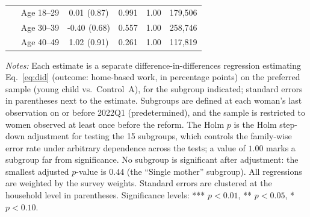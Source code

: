 \begin{table}[H]
{\begin{tabular}{lcccc}
$\quad$ Age 18--29 & 0.01$^{}$ (0.87) & 0.991 & 1.00 & 179,506 \\
$\quad$ Age 30--39 & -0.40$^{}$ (0.68) & 0.557 & 1.00 & 258,746 \\
$\quad$ Age 40--49 & 1.02$^{}$ (0.91) & 0.261 & 1.00 & 117,819 \\
\bottomrule\end{tabular}}
\par\vspace{3pt}\footnotesize\raggedright \textit{Notes:} Each estimate is a separate difference-in-differences regression estimating Eq.~\eqref{eq:did} (outcome: home-based work, in percentage points) on the preferred sample (young child vs.\ Control~A), for the subgroup indicated; standard errors in parentheses next to the estimate. Subgroups are defined at each woman's last observation on or before 2022Q1 (predetermined), and the sample is restricted to women observed at least once before the reform. The Holm $p$ is the Holm step-down adjustment for testing the 15 subgroups, which controls the family-wise error rate under arbitrary dependence across the tests; a value of $1.00$ marks a subgroup far from significance. No subgroup is significant after adjustment: the smallest adjusted $p$-value is $0.44$ (the ``Single mother'' subgroup). All regressions are weighted by the survey weights. Standard errors are clustered at the household level in parentheses. Significance levels: *** $p<0.01$, ** $p<0.05$, * $p<0.10$.
\end{table}
